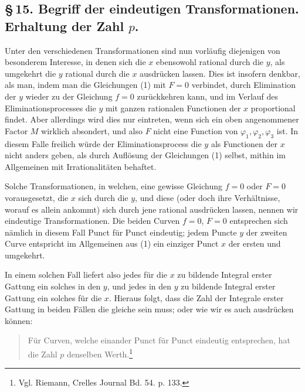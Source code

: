 \documentclass[10pt]{article}
\begin{document}
\subsection*{\S\,15. Begriff der eindeutigen Transformationen. Erhaltung der Zahl \(p\).}

Unter den verschiedenen Transformationen sind nun vorläufig diejenigen von besonderem Interesse, in denen sich die \(x\) ebensowohl rational durch die \(y\), als umgekehrt die \(y\) rational durch die \(x\) ausdrücken lassen. Dies ist insofern denkbar, als man, indem man die Gleichungen (1) mit \(F=0\) verbindet, durch Elimination der \(y\) wieder zu der Gleichung \(f=0\) zurückkehren kann, und im Verlauf des Eliminationsprocesses die \(y\) mit ganzen rationalen Functionen der \(x\) proportional findet. Aber allerdings wird dies nur eintreten, wenn sich ein oben angenommener Factor \(M\) wirklich absondert, und also \(F\) nicht eine Function von \(\varphi_1,\varphi_2,\varphi_3\) ist. In diesem Falle freilich würde der Eliminationsprocess die \(y\) als Functionen der \(x\) nicht anders geben, als durch Auflösung der Gleichungen (1) selbst, mithin im Allgemeinen mit Irrationalitäten behaftet.

Solche Transformationen, in welchen, eine gewisse Gleichung \(f=0\) oder \(F=0\) vorausgesetzt, die \(x\) sich durch die \(y\), und diese (oder doch ihre Verhältnisse, worauf es allein ankommt) sich durch jene rational ausdrücken lassen, nennen wir eindeutige Transformationen. Die beiden Curven \(f=0\), \(F=0\) entsprechen sich nämlich in diesem Fall Punct für Punct eindeutig; jedem Puncte \(y\) der zweiten Curve entspricht im Allgemeinen aus (1) ein einziger Punct \(x\) der ersten und umgekehrt.

In einem solchen Fall liefert also jedes für die \(x\) zu bildende Integral erster Gattung ein solches in den \(y\), und jedes in den \(y\) zu bildende Integral erster Gattung ein solches für die \(x\). Hieraus folgt, dass die Zahl der Integrale erster Gattung in beiden Fällen die gleiche sein muss; oder wie wir es auch ausdrücken können:

\begin{quote}
Für Curven, welche einander Punct für Punct eindeutig entsprechen, hat die Zahl \(p\) denselben Werth.\footnote{Vgl. Riemann, Crelles Journal Bd. 54. p. 133.}
\end{quote}
\end{document}
